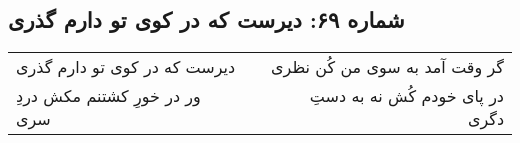\begin{center}
\section*{شماره ۶۹: دیرست که در کوی تو دارم گذری}
\label{sec:069}
\begin{longtable}{l p{0.5cm} r}
دیرست که در کوی تو دارم گذری
&&
گر وقت آمد به سوی من کُن نظری
\\
ور در خورِ کشتنم مکش دردِ سری
&&
در پای خودم کُش نه به دستِ دگری
\\
\end{longtable}
\end{center}
